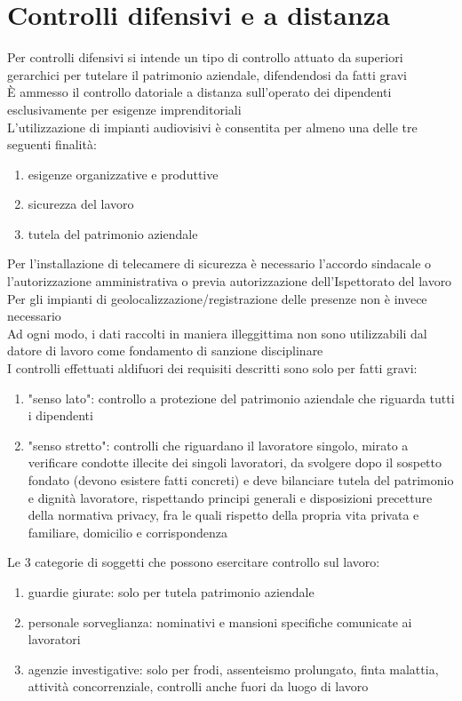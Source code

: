 \documentclass[8pt,oneside,a4paper]{article}
\begin{document}
	\section{Controlli difensivi e a distanza}
	Per controlli difensivi si intende un tipo di controllo attuato da superiori gerarchici per tutelare il patrimonio aziendale, difendendosi da fatti gravi\\
	È ammesso il controllo datoriale a distanza sull'operato dei dipendenti esclusivamente per esigenze imprenditoriali\\
	L'utilizzazione di impianti audiovisivi è consentita per almeno una delle tre seguenti finalità:
	\begin{enumerate}
		\item esigenze organizzative e produttive
		\item sicurezza del lavoro
		\item tutela del patrimonio aziendale
	\end{enumerate}
	Per l'installazione di telecamere di sicurezza è necessario l'accordo sindacale o l'autorizzazione amministrativa o previa autorizzazione dell'Ispettorato del lavoro\\
	Per gli impianti di geolocalizzazione/registrazione delle presenze non è invece necessario\\
	Ad ogni modo, i dati raccolti in maniera illeggittima non sono utilizzabili dal datore di lavoro come fondamento di sanzione disciplinare\\
	I controlli effettuati aldifuori dei requisiti descritti sono solo per fatti gravi:
	\begin{enumerate}
		\item "senso lato": controllo a protezione del patrimonio aziendale che riguarda tutti i dipendenti
		\item "senso stretto": controlli che riguardano il lavoratore singolo, mirato a verificare condotte illecite dei singoli lavoratori, da svolgere dopo il sospetto fondato (devono esistere fatti concreti) e deve bilanciare tutela del patrimonio e dignità lavoratore, rispettando principi generali e disposizioni precetture della normativa privacy, fra le quali rispetto della propria vita privata e familiare, domicilio e corrispondenza
	\end{enumerate}
	Le 3 categorie di soggetti che possono esercitare controllo sul lavoro:
	\begin{enumerate}
		\item guardie giurate: solo per tutela patrimonio aziendale
		\item personale sorveglianza: nominativi e mansioni specifiche comunicate ai lavoratori
		\item agenzie investigative: solo per frodi, assenteismo prolungato, finta malattia, attività concorrenziale, controlli anche fuori da luogo di lavoro
	\end{enumerate}
\end{document}
